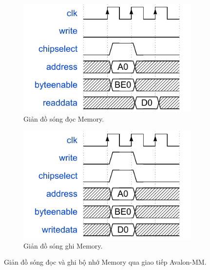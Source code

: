\begin{itemize}
    \begin{figure}[htbp]
        \centering
        \begin{subfigure}[b]{0.48\textwidth}
            \centering
            \includegraphics[width=\linewidth]{Images/02_07_Memory_ReadWaveform.pdf}
            \caption{Giản đồ sóng đọc Memory.}
            \label{fig:02_07_memory_read_sub}
        \end{subfigure}
        \hfill
        \begin{subfigure}[b]{0.48\textwidth}
            \centering
            \includegraphics[width=\linewidth]{Images/02_08_Memory_WriteWaveform.pdf}
            \caption{Giản đồ sóng ghi Memory.}
            \label{fig:02_08_memory_write_sub}
        \end{subfigure}
        \caption{Giản đồ sóng đọc và ghi bộ nhớ Memory qua giao tiếp Avalon-MM.}
        \label{fig:memory_waveforms}
    \end{figure}


\end{itemize}
